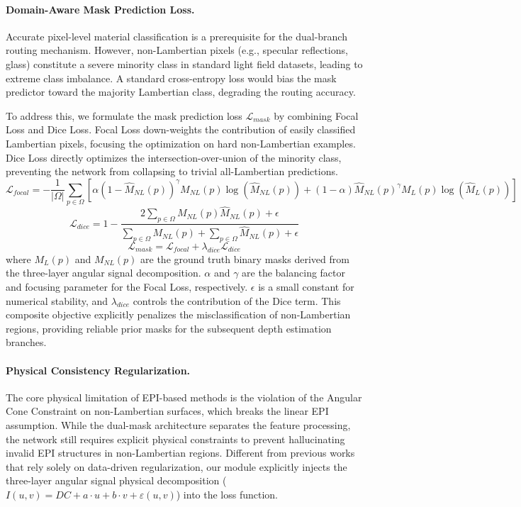 \paragraph{Domain-Aware Mask Prediction Loss.}
Accurate pixel-level material classification is a prerequisite for the dual-branch routing mechanism. However, non-Lambertian pixels (e.g., specular reflections, glass) constitute a severe minority class in standard light field datasets, leading to extreme class imbalance. A standard cross-entropy loss would bias the mask predictor toward the majority Lambertian class, degrading the routing accuracy.

To address this, we formulate the mask prediction loss $\mathcal{L}_{mask}$ by combining Focal Loss and Dice Loss. Focal Loss down-weights the contribution of easily classified Lambertian pixels, focusing the optimization on hard non-Lambertian examples. Dice Loss directly optimizes the intersection-over-union of the minority class, preventing the network from collapsing to trivial all-Lambertian predictions.
\begin{equation}
\label{eq:eq26}
\mathcal{L}_{focal} = -\frac{1}{|\Omega|} \sum_{p \in \Omega} \left[ \alpha (1-\hat{M}_{NL}(p))^\gamma M_{NL}(p) \log(\hat{M}_{NL}(p)) + (1-\alpha) \hat{M}_{NL}(p)^\gamma M_L(p) \log(\hat{M}_L(p)) \right]
\end{equation}
\begin{equation}
\label{eq:eq27}
\mathcal{L}_{dice} = 1 - \frac{2 \sum_{p \in \Omega} M_{NL}(p)\hat{M}_{NL}(p) + \epsilon}{\sum_{p \in \Omega} M_{NL}(p) + \sum_{p \in \Omega} \hat{M}_{NL}(p) + \epsilon}
\end{equation}
\begin{equation}
\label{eq:eq28}
\mathcal{L}_{mask} = \mathcal{L}_{focal} + \lambda_{dice} \mathcal{L}_{dice}
\end{equation}
where $M_L(p)$ and $M_{NL}(p)$ are the ground truth binary masks derived from the three-layer angular signal decomposition. $\alpha$ and $\gamma$ are the balancing factor and focusing parameter for the Focal Loss, respectively. $\epsilon$ is a small constant for numerical stability, and $\lambda_{dice}$ controls the contribution of the Dice term. This composite objective explicitly penalizes the misclassification of non-Lambertian regions, providing reliable prior masks for the subsequent depth estimation branches.

\paragraph{Physical Consistency Regularization.}
The core physical limitation of EPI-based methods is the violation of the Angular Cone Constraint on non-Lambertian surfaces, which breaks the linear EPI assumption. While the dual-mask architecture separates the feature processing, the network still requires explicit physical constraints to prevent hallucinating invalid EPI structures in non-Lambertian regions. Different from previous works that rely solely on data-driven regularization, our module explicitly injects the three-layer angular signal physical decomposition ($I(u,v) = DC + a \cdot u + b \cdot v + \varepsilon(u,v)$) into the loss function.

